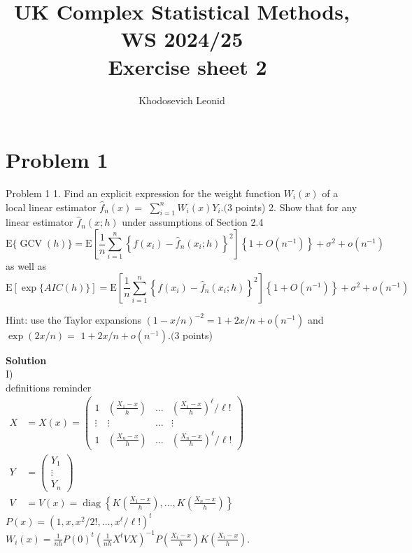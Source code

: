 \documentclass[11pt, oneside]{article}   	%
\title{%
  UK Complex Statistical Methods, WS 2024/25\\\
  Exercise sheet 2}
\author{Khodosevich Leonid}
\begin{document}
\maketitle

\section{Problem 1}

Problem 1
1. Find an explicit expression for the weight function $W_i(x)$ of a local linear estimator $\hat{f}_n(x)=$ $\sum_{i=1}^n W_i(x) Y_i .(3$ points)
2. Show that for any linear estimator $\hat{f}_n(x ; h)$ under assumptions of Section 2.4
$$
\mathrm{E}\{\operatorname{GCV}(h)\}=\mathrm{E}\left[\frac{1}{n} \sum_{i=1}^n\left\{f\left(x_i\right)-\widehat{f}_n\left(x_i ; h\right)\right\}^2\right]\left\{1+O\left(n^{-1}\right)\right\}+\sigma^2+o\left(n^{-1}\right)
$$
as well as
$$
\mathrm{E}[\exp \{A I C(h)\}]=\mathrm{E}\left[\frac{1}{n} \sum_{i=1}^n\left\{f\left(x_i\right)-\widehat{f}_n\left(x_i ; h\right)\right\}^2\right]\left\{1+O\left(n^{-1}\right)\right\}+\sigma^2+o\left(n^{-1}\right)
$$

Hint: use the Taylor expansions $(1-x / n)^{-2}=1+2 x / n+o\left(n^{-1}\right)$ and $\exp (2 x / n)=$ $1+2 x / n+o\left(n^{-1}\right) .(3$ points)

\large{\textbf{Solution}}\\
I)\\
definitions reminder\\
$\begin{aligned} X & =X(x)=\left(\begin{array}{cccc}1 & \left(\frac{X_1-x}{h}\right) & \ldots & \left(\frac{X_1-x}{h}\right)^{\ell} / \ell! \\ \vdots & \vdots & \ldots & \vdots \\ 1 & \left(\frac{X_n-x}{h}\right) & \ldots & \left(\frac{X_n-x}{h}\right)^{\ell} / \ell!\end{array}\right)\\
Y & = \left(\begin{array}{c}Y_1 \\ \vdots \\ Y_n\end{array}\right) \\ 
V & =V(x)=\operatorname{diag}\left\{K\left(\frac{X_1-x}{h}\right), \ldots, K\left(\frac{X_n-x}{h}\right)\right\}\end{aligned}$
\\
$P(x)=\left(1, x, x^2 / 2!, \ldots, x^{\ell} / \ell!\right)^t$
\\
$W_i(x)=\frac{1}{n h} P(0)^t\left(\frac{1}{n h} X^t V X\right)^{-1} P\left(\frac{X_i-x}{h}\right) K\left(\frac{X_i-x}{h}\right)$.
\end{document}
